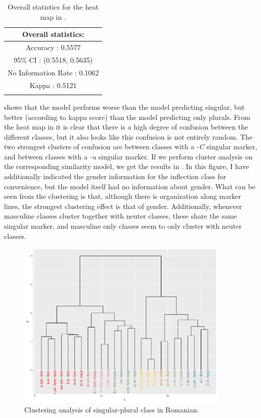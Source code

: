 \begin{table}[!htpb]
  \centering
  \begin{tabular}{c}
    \lsptoprule
    Overall statistics: \\
    \midrule
    Accuracy : 0.5577\\
    95\% CI : (0.5518, 0.5635)\\
    No Information Rate : 0.1062\\
    Kappa : 0.5121\\
    \lspbottomrule
  \end{tabular}
  \caption{Overall statistics for the heat map in .}\label{tab:class-1-romanian-stats}
\end{table}

 shows that the model performs worse than the model predicting singular, but better (according to kappa score) than the model predicting only plurals. From the heat map in  it is clear that there is a high degree of confusion between the different classes, but it also looks like this confusion is not entirely random. The two strongest clusters of confusion are between classes with a \textit{-C} singular marker, and between classes with a \textit{-u} singular marker. If we perform cluster analysis on the corresponding similarity model, we get the results in . In this figure, I have additionally indicated the gender information for the inflection class for convenience, but the model itself had no information about gender. What can be seen from the clustering is that, although there is organization along marker lines, the strongest clustering effect is that of gender. Additionally, whenever masculine classes cluster together with neuter classes, these share the same singular marker, and masculine only classes seem to only cluster with neuter classes.

\begin{figure}[!ptbh]
  \centering
  \includegraphics[width=0.9\textwidth]{./figures/romanian/romanian-clust-class-1.pdf}
  \caption{Clustering analysis of singular-plural class in Romanian.}\label{fig:romanian-clust-class-1}
\end{figure}

